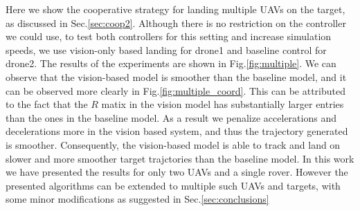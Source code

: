 \documentclass[conf]{new-aiaa}
\begin{document}
Here we show the cooperative strategy for landing multiple UAVs on the target, as discussed in Sec.\ref{sec:coop2}. Although there is no restriction on the controller we could use, to test both controllers for this setting and increase simulation speeds, we use vision-only based landing for drone1 and baseline control for drone2. The results of the experiments are shown in Fig.\ref{fig:multiple}. We can observe that the vision-based model is smoother than the baseline model, and it can be observed more clearly in Fig.\ref{fig:multiple_coord}. This can be attributed to the fact that the $R$ matix in the vision model has substantially larger entries than the ones in the baseline model. As a result we penalize accelerations and decelerations more in the vision based system, and thus the trajectory generated is smoother. Consequently, the vision-based model is able to track and land on slower and more smoother target trajctories than the baseline model. In this work we have presented the results for only two UAVs and a single rover. However the presented algorithms can be extended to multiple such UAVs and targets, with some minor modifications as suggested in Sec.\ref{sec:conclusions}
\end{document}
